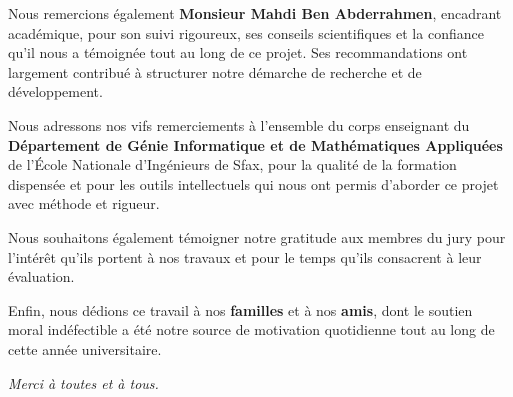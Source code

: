 \documentclass[12pt,a4paper]{article}
\begin{document}
Nous remercions \'{e}galement \textbf{Monsieur Mahdi Ben Abderrahmen}, encadrant acad\'{e}mique, pour son suivi rigoureux, ses conseils scientifiques et la confiance qu'il nous a t\'{e}moign\'{e}e tout au long de ce projet. Ses recommandations ont largement contribu\'{e} \`{a} structurer notre d\'{e}marche de recherche et de d\'{e}veloppement.

Nous adressons nos vifs remerciements \`{a} l'ensemble du corps enseignant du \textbf{D\'{e}partement de G\'{e}nie Informatique et de Math\'{e}matiques Appliqu\'{e}es} de l'\'{E}cole Nationale d'Ing\'{e}nieurs de Sfax, pour la qualit\'{e} de la formation dispens\'{e}e et pour les outils intellectuels qui nous ont permis d'aborder ce projet avec m\'{e}thode et rigueur.

Nous souhaitons \'{e}galement t\'{e}moigner notre gratitude aux membres du jury pour l'int\'{e}r\^{e}t qu'ils portent \`{a} nos travaux et pour le temps qu'ils consacrent \`{a} leur \'{e}valuation.

Enfin, nous d\'{e}dions ce travail \`{a} nos \textbf{familles} et \`{a} nos \textbf{amis}, dont le soutien moral ind\'{e}fectible a \'{e}t\'{e} notre source de motivation quotidienne tout au long de cette ann\'{e}e universitaire.

\bigskip
\noindent\textit{Merci \`{a} toutes et \`{a} tous.}
\end{document}

